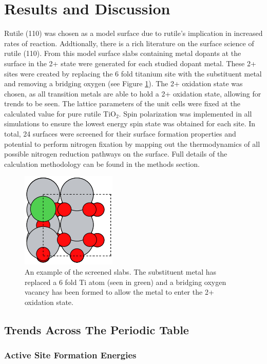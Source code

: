 \documentclass[catalysts,article,submit,moreauthors,pdftex,10pt,a4paper]{mdpi}
\theoremstyle{mdpi}
\newcounter{ex}
\newcounter{re}
\theoremstyle{mdpidefinition}
\begin{document}
\section{Results and Discussion}
Rutile (110) was chosen as a model surface due to rutile's implication in increased rates of reaction.\cite{Schrauzer_1977} Addtionally, there is a rich literature on the surface science of rutile (110)\cite{Diebold2003,Yates_1991,Lu1994,Walle2009}. From this model surface slabs containing metal dopants at the surface in the 2+ state were generated for each studied dopant metal. These 2+ sites were created by replacing the 6 fold titanium site with the substituent metal and removing a bridging oxygen (see Figure \ref{fig:ex_slab}). The 2+ oxidation state was chosen, as all transition metals are able to hold a 2+ oxidation state\cite{Greenwood_chemistry_text_book}, allowing for trends to be seen. The lattice parameters of the unit cells were fixed at the calculated value for pure rutile TiO$_2$. Spin polarization was implemented in all simulations to ensure the lowest energy spin state was obtained for each site. In total, 24 surfaces were screened for their surface formation properties and potential to perform nitrogen fixation by mapping out the thermodynamics of all possible nitrogen reduction pathways on the surface. Full details of the calculation methodology can be found in the methods section.

\begin{figure}
    \centering
    \includegraphics[width=0.3\linewidth]{Images/ex_slab.png}
    \caption{An example of the screened slabs. The substituent metal has replaced a 6 fold Ti atom (seen in green) and a bridging oxygen vacancy has been formed to allow the metal to enter the 2+ oxidation state.}
    \label{fig:ex_slab}
\end{figure}

\subsection{Trends Across The Periodic Table}

\subsubsection{Active Site Formation Energies}
\end{document}
